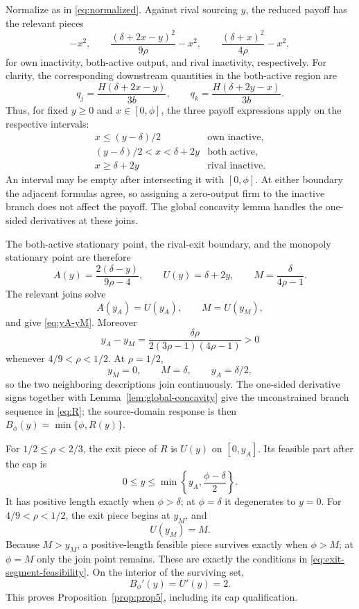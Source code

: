 Normalize as in \eqref{eq:normalized}.  Against rival sourcing \(y\), the
reduced payoff has the relevant pieces
\[
-x^2,
\qquad
\frac{(\delta+2x-y)^2}{9\rho}-x^2,
\qquad
\frac{(\delta+x)^2}{4\rho}-x^2,
\]
for own inactivity, both-active output, and rival inactivity, respectively.
For clarity, the corresponding downstream quantities in the both-active region are
\[
q_j=\frac{H(\delta+2x-y)}{3b},\qquad
q_k=\frac{H(\delta+2y-x)}{3b}.
\]
Thus, for fixed \(y\ge0\) and \(x\in[0,\phi]\), the three payoff
expressions apply on the respective intervals:
\[
\begin{array}{ll}
x\le(y-\delta)/2 & \text{own inactive},\\
(y-\delta)/2<x<\delta+2y & \text{both active},\\
x\ge\delta+2y & \text{rival inactive}.
\end{array}
\]
An interval may be empty after intersecting it with \([0,\phi]\).
At either boundary the adjacent formulas agree, so assigning a zero-output
firm to the inactive branch does not affect the payoff.  The global concavity
lemma handles the one-sided derivatives at these joins.

The both-active stationary point, the rival-exit boundary, and the monopoly
stationary point are therefore
\[
A(y)=\frac{2(\delta-y)}{9\rho-4},
\qquad
U(y)=\delta+2y,
\qquad
M=\frac{\delta}{4\rho-1}.
\]
The relevant joins solve
\[
A(y_A)=U(y_A),
\qquad
M=U(y_M),
\]
and give \eqref{eq:yA-yM}.  Moreover
\[
y_A-y_M
=
\frac{\delta\rho}
{2(3\rho-1)(4\rho-1)}
>0
\]
whenever \(4/9<\rho<1/2\).  At \(\rho=1/2\),
\[
y_M=0,\qquad M=\delta,\qquad y_A=\delta/2,
\]
so the two neighboring descriptions join continuously.  The one-sided
derivative signs together with Lemma~\ref{lem:global-concavity} give the
unconstrained branch sequence in \eqref{eq:R}; the source-domain response is
then \(B_\phi(y)=\min\{\phi,R(y)\}\).

For \(1/2\le\rho<2/3\), the exit piece of \(R\) is
\(U(y)\) on \([0,y_A]\).  Its feasible part after the cap is
\[
0\le y\le
\min\left\{y_A,\frac{\phi-\delta}{2}\right\}.
\]
It has positive length exactly when \(\phi>\delta\); at
\(\phi=\delta\) it degenerates to \(y=0\).  For
\(4/9<\rho<1/2\), the exit piece begins at \(y_M\), and
\[
U(y_M)=M.
\]
Because \(M>y_M\), a positive-length feasible piece survives exactly when
\(\phi>M\); at \(\phi=M\) only the join point remains.  These are exactly
the conditions in \eqref{eq:exit-segment-feasibility}.  On the interior of
the surviving set,
\[
B_\phi'(y)=U'(y)=2.
\]
This proves Proposition~\ref{prop:prop5}, including its cap qualification.

